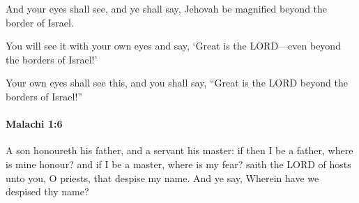 			\begin{versebox}
					\item[BHS] 
					\item[LXX] 
					\item[ASV] And your eyes shall see, and ye shall say, Jehovah be magnified beyond the border of Israel.
					\item[NIV] You will see it with your own eyes and say, ‘Great is the LORD—even beyond the borders of Israel!’
					\item[NRSV] Your own eyes shall see this, and you shall say, “Great is the LORD beyond the borders of Israel!”
			\end{versebox}

		\paragraph{Malachi 1:6} %
			\label{MALACHI-1-6}

			A son honoureth his father, and a servant his master: if then I be a father, where is mine honour? and if I be a master, where is my fear? saith the LORD of hosts unto you, O priests, that despise my name. And ye say, Wherein have we despised thy name?

